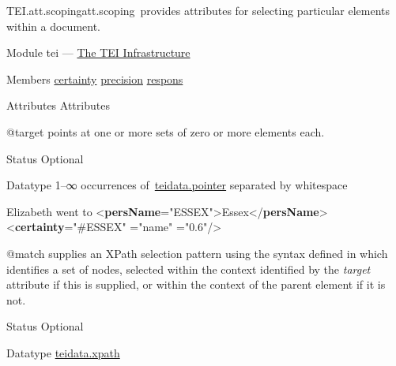 \begin{reflist}
\item[]\begin{specHead}{TEI.att.scoping}{att.scoping} provides attributes for selecting particular elements within a document.\end{specHead} 
    \item[{Module}]
  tei — \hyperref[ST]{The TEI Infrastructure}
    \item[{Members}]
  \hyperref[TEI.certainty]{certainty} \hyperref[TEI.precision]{precision} \hyperref[TEI.respons]{respons}
    \item[{Attributes}]
  Attributes\hfil\\[-10pt]\begin{sansreflist}
    \item[@target]
  points at one or more sets of zero or more elements each.
\begin{reflist}
    \item[{Status}]
  Optional
    \item[{Datatype}]
  1–∞ occurrences of \hyperref[TEI.teidata.pointer]{teidata.pointer} separated by whitespace
    \item[]\exampleFont Elizabeth went to {<\textbf{persName}\hspace*{1em}{xml:id}="{ESSEX}">}Essex{</\textbf{persName}>}\mbox{}\newline 
{<\textbf{certainty}\hspace*{1em}{target}="{\#ESSEX}"\mbox{}\newline 
\hspace*{1em}{locus}="{name}"\mbox{}\newline 
\hspace*{1em}{degree}="{0.6}"/>}
\end{reflist}  
    \item[@match]
  supplies an XPath selection pattern using the syntax defined in \cite{XSLT3} which identifies a set of nodes, selected within the context identified by the {\itshape target} attribute if this is supplied, or within the context of the parent element if it is not.
\begin{reflist}
    \item[{Status}]
  Optional
    \item[{Datatype}]
  \hyperref[TEI.teidata.xpath]{teidata.xpath}

\end{reflist}
\end{sansreflist}
\end{reflist}
